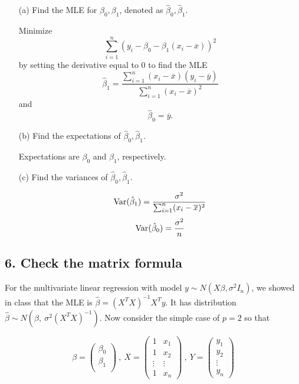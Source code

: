 \documentclass{tufte-book}
\begin{document}
\begin{enumerate}
\item[(a)] Find the MLE for $\beta_0, \beta_1$, denoted as $\hat{\beta}_0, \hat{\beta}_1$.

Minimize
\[ \sum_{i=1}^n(y_i - \beta_0 - \beta_1(x_i-\overline{x}))^2 \]
by setting the derivative equal to 0 to find the MLE
\[ \hat{\beta}_1 = \frac{\sum_{i=1}^n(x_i-\overline{x})(y_i-\overline{y})}{\sum_{i=1}^n(x_i-\overline{x})^2} \]
and
\[ \hat{\beta}_0 = \overline{y}.\]

\item[(b)] Find the expectations of $\hat{\beta}_0, \hat{\beta}_1$.

Expectations are $\beta_0$ and $\beta_1$, respectively.

\item[(c)] Find the variances of $\hat{\beta}_0, \hat{\beta}_1$.

\[ \operatorname{Var}(\hat{\beta}_1)=\frac{\sigma^2}{\sum_{i=1}^n(x_i-\overline{x})^2} \]
\[ \operatorname{Var}(\hat{\beta}_0)=\frac{\sigma^2}{n} \]
\end{enumerate}


\subsection{6. Check the matrix formula}  For the multivariate linear regression with model $y\sim N(X\beta, \sigma^2 I_n)$, we showed in class that the MLE is $\hat{\beta}=(X^TX)^{-1}X^Ty$. It has distribution $\hat{\beta} \sim N(\beta, \ \sigma^2(X^TX)^{-1})$.  Now consider the simple case of $p=2$ so that

\[ \beta=
\begin{pmatrix}
\beta_0 \\
\beta_1 \\
\end{pmatrix}
 \ , \ X =
\begin{pmatrix}
1 & x_1 \\
1 & x_2 \\
\vdots & \vdots \\
1 & x_n
\end{pmatrix}
\ , \ Y=
\begin{pmatrix}
y_1 \\
y_2 \\
\vdots \\
y_n
\end{pmatrix}
\]
\end{document}
